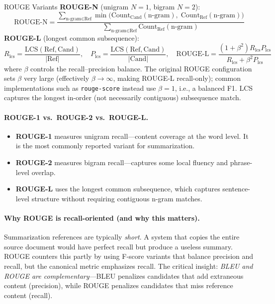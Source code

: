\begin{mathresult}{ROUGE Variants}
\textbf{ROUGE-N} (unigram $N{=}1$, bigram $N{=}2$):
\[
    \text{ROUGE-N} = \frac{\sum_{\text{n-gram} \in \text{Ref}} \min\!\bigl(\text{Count}_{\text{Cand}}(\text{n-gram}),\;\text{Count}_{\text{Ref}}(\text{n-gram})\bigr)}{\sum_{\text{n-gram} \in \text{Ref}} \text{Count}_{\text{Ref}}(\text{n-gram})}
\]
\textbf{ROUGE-L} (longest common subsequence):
\[
    R_{\text{lcs}} = \frac{\text{LCS}(\text{Ref}, \text{Cand})}{|\text{Ref}|}, \quad
    P_{\text{lcs}} = \frac{\text{LCS}(\text{Ref}, \text{Cand})}{|\text{Cand}|}, \quad
    \text{ROUGE-L} = \frac{(1+\beta^2) R_{\text{lcs}} P_{\text{lcs}}}{R_{\text{lcs}} + \beta^2 P_{\text{lcs}}}
\]
where $\beta$ controls the recall--precision balance.  The original ROUGE
configuration sets $\beta$ very large (effectively $\beta \to \infty$, making
ROUGE-L recall-only); common implementations such as \texttt{rouge-score}
instead use $\beta = 1$, i.e., a balanced F1.
LCS captures the longest in-order (not necessarily contiguous) subsequence match.
\end{mathresult}

\paragraph{ROUGE-1 vs.\ ROUGE-2 vs.\ ROUGE-L.}
\begin{itemize}
    \item \textbf{ROUGE-1} measures unigram recall---content coverage at the word
          level.  It is the most commonly reported variant for summarization.
    \item \textbf{ROUGE-2} measures bigram recall---captures some local fluency
          and phrase-level overlap.
    \item \textbf{ROUGE-L} uses the longest common subsequence, which captures
          sentence-level structure without requiring contiguous n-gram matches.
\end{itemize}

\paragraph{Why ROUGE is recall-oriented (and why this matters).}
Summarization references are typically \emph{short}.  A system that copies the
entire source document would have perfect recall but produce a useless summary.
ROUGE counters this partly by using F-score variants that balance precision and
recall, but the canonical metric emphasizes recall.  The critical insight:
\emph{BLEU and ROUGE are complementary}---BLEU penalizes candidates that add
extraneous content (precision), while ROUGE penalizes candidates that miss
reference content (recall).

